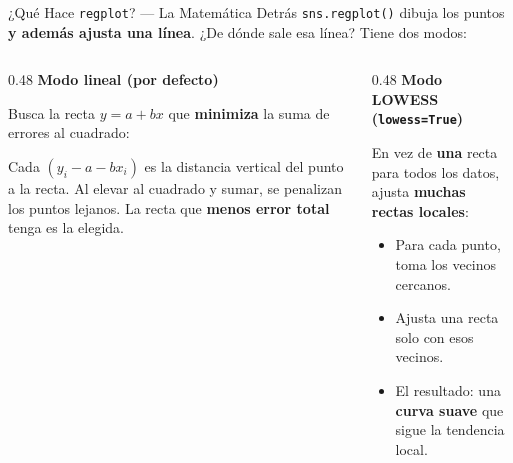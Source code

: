 \documentclass[aspectratio=169, 11pt]{beamer}
\begin{document}
\begin{frame}[shrink=10]{¿Qué Hace \texttt{regplot}? --- La Matemática Detrás}
  \vspace{-4pt}
  {\footnotesize
    \texttt{sns.regplot()} dibuja los puntos \textbf{y además ajusta una línea}.
    ¿De dónde sale esa línea? Tiene dos modos:}

  \vspace{6pt}
  \begin{columns}[T]
    \begin{column}{0.48\textwidth}
      {\footnotesize\bfseries\color{codeBlue} Modo lineal (por defecto)}
      \vspace{4pt}

      {\scriptsize
      Busca la recta $y = a + bx$ que \textbf{minimiza} la suma de errores al cuadrado:
      }

      \vspace{4pt}
      \begin{center}
      \end{center}

      \vspace{4pt}
      {\scriptsize
      Cada $(y_i - a - bx_i)$ es la distancia vertical del punto a la recta.
      Al elevar al cuadrado y sumar, se penalizan los puntos lejanos.
      La recta que \textbf{menos error total} tenga es la elegida.
      }
    \end{column}

    \begin{column}{0.48\textwidth}
      {\footnotesize\bfseries\color{codePurple} Modo LOWESS (\texttt{lowess=True})}
      \vspace{4pt}

      {\scriptsize
      En vez de \textbf{una} recta para todos los datos, ajusta \textbf{muchas rectas locales}:
      }

      \vspace{4pt}
      {\scriptsize
      \begin{itemize}\setlength{\itemsep}{3pt}
        \item Para cada punto, toma los vecinos cercanos.
        \item Ajusta una recta solo con esos vecinos.
        \item El resultado: una \textbf{curva suave} que sigue la tendencia local.
      \end{itemize}
      }


\end{column}
\end{columns}
\end{frame}
\end{document}
